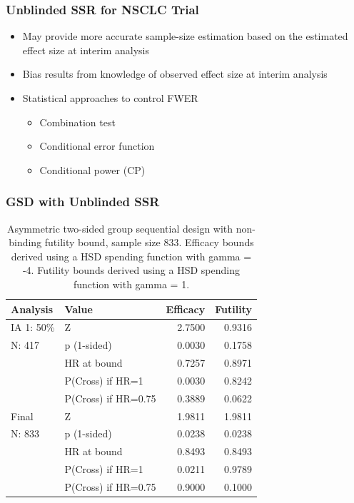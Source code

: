 \documentclass{beamer}
\begin{document}
\begin{frame}
	\frametitle{Unblinded SSR for NSCLC Trial}
	\begin{itemize}
		\item May provide more accurate sample-size estimation based on the estimated effect size at interim analysis
		\item Bias results from knowledge of observed effect size at interim analysis
		\item Statistical approaches to control FWER \begin{itemize}
			    \item Combination test
				\item Conditional error function
				\item Conditional power (CP)
			\end{itemize}
	\end{itemize}
\end{frame}
\begin{frame}
	\frametitle{GSD with Unblinded SSR}
\begin{table}[ht]
	\caption{Asymmetric two-sided group sequential design with non-binding futility bound, sample size 833. Efficacy bounds derived using a HSD spending function with gamma = -4. Futility bounds derived using a HSD spending function with gamma = 1.} 
	\label{tab5}
		\centering\small
	\begin{tabular}{llrr}
		\hline
		Analysis & Value & Efficacy & Futility \\ 
		\hline
		IA 1: 50\% & Z & 2.7500 & 0.9316 \\ 
		N: 417 & p (1-sided) & 0.0030 & 0.1758 \\ 
		& HR at bound & 0.7257 & 0.8971 \\ 
		& P(Cross) if HR=1 & 0.0030 & 0.8242 \\ 
		& P(Cross) if HR=0.75 & 0.3889 & 0.0622 \\ 
		\hline
		Final & Z & 1.9811 & 1.9811 \\ 
		N: 833 & p (1-sided) & 0.0238 & 0.0238 \\ 
		& HR at bound & 0.8493 & 0.8493 \\ 
		& P(Cross) if HR=1 & 0.0211 & 0.9789 \\ 
		& P(Cross) if HR=0.75 & 0.9000 & 0.1000 \\ 
		\hline
	\end{tabular}
\end{table}
\end{frame}
\end{document}

